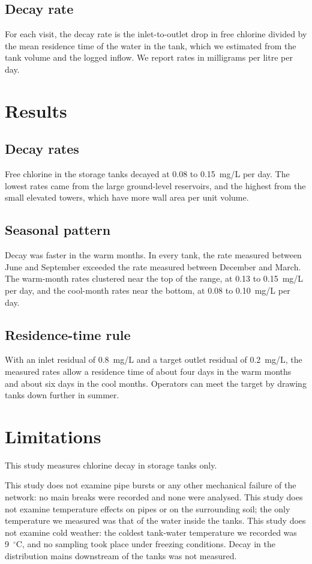\documentclass{article}
\begin{document}
\subsection{Decay rate}
\label{sec:method-rate}

For each visit, the decay rate is the inlet-to-outlet drop in free chlorine
divided by the mean residence time of the water in the tank, which we
estimated from the tank volume and the logged inflow. We report rates in
milligrams per litre per day.

\section{Results}
\label{sec:results}

\subsection{Decay rates}
\label{sec:results-rates}

Free chlorine in the storage tanks decayed at 0.08 to 0.15~mg/L per day. The
lowest rates came from the large ground-level reservoirs, and the highest from
the small elevated towers, which have more wall area per unit volume.

\subsection{Seasonal pattern}
\label{sec:results-season}

Decay was faster in the warm months. In every tank, the rate measured between
June and September exceeded the rate measured between December and March. The
warm-month rates clustered near the top of the range, at 0.13 to 0.15~mg/L per
day, and the cool-month rates near the bottom, at 0.08 to 0.10~mg/L per day.

\subsection{Residence-time rule}
\label{sec:results-rule}

With an inlet residual of 0.8~mg/L and a target outlet residual of 0.2~mg/L,
the measured rates allow a residence time of about four days in the warm months
and about six days in the cool months. Operators can meet the target by drawing
tanks down further in summer.

\section{Limitations}
\label{sec:limitations}

This study measures chlorine decay in storage tanks only.

This study does not examine pipe bursts or any other mechanical failure of the
network: no main breaks were recorded and none were analysed. This study does
not examine temperature effects on pipes or on the surrounding soil; the only
temperature we measured was that of the water inside the tanks. This study does
not examine cold weather: the coldest tank-water temperature we recorded was
9~$^\circ$C, and no sampling took place under freezing conditions. Decay in
the distribution mains downstream of the tanks was not measured.
\end{document}
